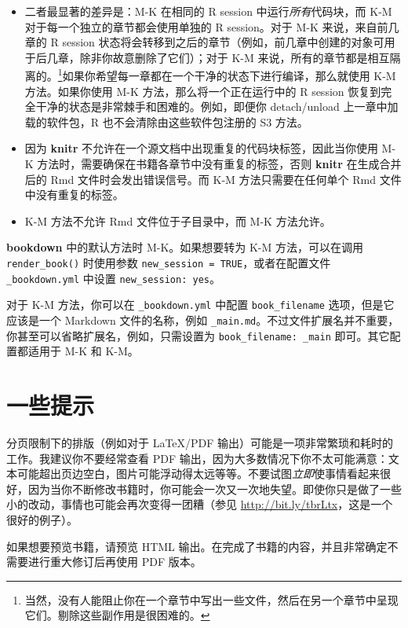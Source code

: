 \documentclass[
  12pt,
]{krantz}
\providecommand{\tightlist}{%
  \setlength{\itemsep}{0pt}\setlength{\parskip}{0pt}}
\theoremstyle{definition}
\theoremstyle{definition}
\theoremstyle{definition}
\theoremstyle{definition}
\theoremstyle{remark}
\begin{document}
\begin{itemize}
\tightlist
\item
  二者最显著的差异是：M-K 在相同的 R session 中运行\emph{所有}代码块，而 K-M 对于每一个独立的章节都会使用单独的 R session。对于 M-K 来说，来自前几章的 R session 状态将会转移到之后的章节（例如，前几章中创建的对象可用于后几章，除非你故意删除了它们）；对于 K-M 来说，所有的章节都是相互隔离的。\footnote{当然，没有人能阻止你在一个章节中写出一些文件，然后在另一个章节中呈现它们。剔除这些副作用是很困难的。}如果你希望每一章都在一个干净的状态下进行编译，那么就使用 K-M 方法。如果你使用 M-K 方法，那么将一个正在运行中的 R session 恢复到完全干净的状态是非常棘手和困难的。例如，即便你 detach/unload 上一章中加载的软件包，R 也不会清除由这些软件包注册的 S3 方法。
\item
  因为 \textbf{knitr} 不允许在一个源文档中出现重复的代码块标签，因此当你使用 M-K 方法时，需要确保在书籍各章节中没有重复的标签，否则 \textbf{knitr} 在生成合并后的 Rmd 文件时会发出错误信号。而 K-M 方法只需要在任何单个 Rmd 文件中没有重复的标签。
\item
  K-M 方法不允许 Rmd 文件位于子目录中，而 M-K 方法允许。
\end{itemize}

\textbf{bookdown} 中的默认方法时 M-K。如果想要转为 K-M 方法，可以在调用 \texttt{render\_book()} 时使用参数 \texttt{new\_session\ =\ TRUE}，或者在配置文件 \texttt{\_bookdown.yml} 中设置 \texttt{new\_session:\ yes}。

对于 K-M 方法，你可以在 \texttt{\_bookdown.yml} 中配置 \texttt{book\_filename} 选项，但是它应该是一个 Markdown 文件的名称，例如 \texttt{\_main.md}。不过文件扩展名并不重要，你甚至可以省略扩展名，例如，只需设置为 \texttt{book\_filename:\ \_main} 即可。其它配置都适用于 M-K 和 K-M。

\hypertarget{ux4e00ux4e9bux63d0ux793a}{%
\section{一些提示}\label{ux4e00ux4e9bux63d0ux793a}}

分页限制下的排版（例如对于 LaTeX/PDF 输出）可能是一项非常繁琐和耗时的工作。我建议你不要经常查看 PDF 输出，因为大多数情况下你不太可能满意：文本可能超出页边空白，图片可能浮动得太远等等。不要试图\emph{立即}使事情看起来很好，因为当你不断修改书籍时，你可能会一次又一次地失望。即使你只是做了一些小的改动，事情也可能会再次变得一团糟（参见 \url{http://bit.ly/tbrLtx}，这是一个很好的例子）。

如果想要预览书籍，请预览 HTML 输出。在完成了书籍的内容，并且非常确定不需要进行重大修订后再使用 PDF 版本。
\end{document}
